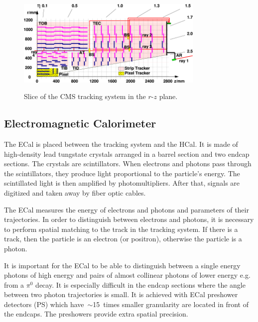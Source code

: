 

\begin{figure}[htb]
  \begin{center}
    {\includegraphics[width=0.8\textwidth]{../figs/Exp/tracker_slice.png}}
    \caption{Slice of the CMS tracking system in the $r$-$z$ plane.}
    \label{fig:tracker_slice}
  \end{center}
\end{figure}

\subsection{Electromagnetic Calorimeter}

The ECal is placed between the tracking system and the HCal. It is made of high-density lead tungstate crystals arranged in a barrel section and two endcap sections. The crystals are scintillators. When electrons and photons pass through the scintillators, they produce light proportional to the particle's energy. The scintillated light is then amplified by photomultipliers. After that, signals are digitized and taken away by fiber optic cables.

The ECal measures the energy of electrons and photons and parameters of their trajectories. In order to distinguish between electrons and photons, it is necessary to perform spatial matching to the track in the tracking system. If there is a track, then the particle is an electron (or positron), otherwise the particle is a photon.

It is important for the ECal to be able to distinguish between a single energy photons of high energy and pairs of almost collinear photons of lower energy e.g. from a $\pi^0$ decay. It is especially difficult in the endcap sections where the angle between two photon trajectories is small. It is achieved with ECal preshower detectors (PS) which have~$\sim$15~times smaller granularity are located in front of the endcaps. The preshowers provide extra spatial precision. 


